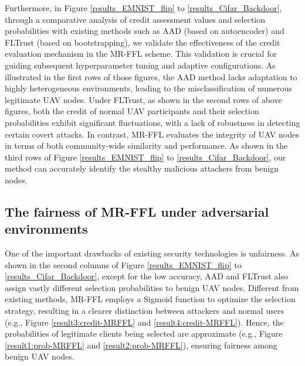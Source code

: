\documentclass[lettersize,journal]{IEEEtran}
\begin{document}
Furthermore, in Figure \ref{results_EMNIST_flip} to \ref{results_Cifar_Backdoor}, through a comparative analysis of credit assessment values and selection probabilities with existing methods such as AAD (based on autoencoder) and FLTrust (based on bootstrapping), we validate the effectiveness of the credit evaluation mechanism in the MR-FFL scheme. This validation is crucial for guiding subsequent hyperparameter tuning and adaptive configurations. As illustrated in the first rows of those figures, the AAD method lacks adaptation to highly heterogeneous environments, leading to the misclassification of numerous legitimate UAV nodes. Under FLTrust, as shown in the second rows of above figures, both the credit of normal UAV participants and their selection probabilities exhibit significant fluctuations, with a lack of robustness in detecting certain covert attacks. In contrast, MR-FFL evaluates the integrity of UAV nodes in terms of both community-wide similarity and performance. As shown in the third rows of Figure \ref{results_EMNIST_flip} to \ref{results_Cifar_Backdoor}, our method can accurately identify the stealthy malicious attackers from benign nodes.


\subsection{The fairness of MR-FFL under adversarial environments}
One of the important drawbacks of existing security technologies is unfairness. As shown in the second columns of Figure \ref{results_EMNIST_flip} to \ref{results_Cifar_Backdoor}, except for the low accuracy, AAD and FLTrust also assign vastly different selection probabilities to benign UAV nodes. Different from existing methods, MR-FFL employs a Sigmoid function to optimize the selection strategy, resulting in a clearer distinction between attackers and normal users (e.g., Figure \ref{result3:credit-MRFFL} and \ref{result4:credit-MRFFL}). Hence, the probabilities of legitimate clients being selected are approximate (e.g., Figure \ref{result1:prob-MRFFL} and \ref{result2:prob-MRFFL}), ensuring fairness among benign UAV nodes.
\end{document}
